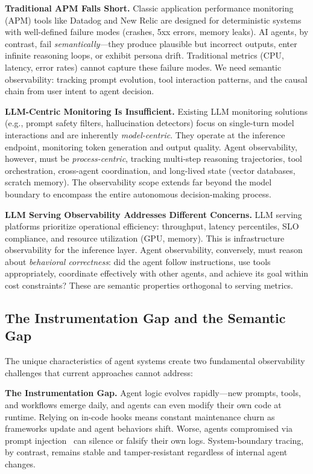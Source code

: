 \documentclass[sigplan,screen,review,9pt]{acmart}
\begin{document}
\textbf{Traditional APM Falls Short.} Classic application performance monitoring (APM) tools like Datadog and New Relic are designed for deterministic systems with well-defined failure modes (crashes, 5xx errors, memory leaks). AI agents, by contrast, fail \emph{semantically}—they produce plausible but incorrect outputs, enter infinite reasoning loops, or exhibit persona drift. Traditional metrics (CPU, latency, error rates) cannot capture these failure modes. We need semantic observability: tracking prompt evolution, tool interaction patterns, and the causal chain from user intent to agent decision.

\textbf{LLM-Centric Monitoring Is Insufficient.} Existing LLM monitoring solutions (e.g., prompt safety filters, hallucination detectors) focus on single-turn model interactions and are inherently \emph{model-centric}. They operate at the inference endpoint, monitoring token generation and output quality. Agent observability, however, must be \emph{process-centric}, tracking multi-step reasoning trajectories, tool orchestration, cross-agent coordination, and long-lived state (vector databases, scratch memory). The observability scope extends far beyond the model boundary to encompass the entire autonomous decision-making process.

\textbf{LLM Serving Observability Addresses Different Concerns.} LLM serving platforms prioritize operational efficiency: throughput, latency percentiles, SLO compliance, and resource utilization (GPU, memory). This is infrastructure observability for the inference layer. Agent observability, conversely, must reason about \emph{behavioral correctness}: did the agent follow instructions, use tools appropriately, coordinate effectively with other agents, and achieve its goal within cost constraints? These are semantic properties orthogonal to serving metrics.

\subsection{The Instrumentation Gap and the Semantic Gap}

The unique characteristics of agent systems create two fundamental observability challenges that current approaches cannot address:

\textbf{The Instrumentation Gap.} Agent logic evolves rapidly—new prompts, tools, and workflows emerge daily, and agents can even modify their own code at runtime. Relying on in-code hooks means constant maintenance churn as frameworks update and agent behaviors shift. Worse, agents compromised via prompt injection~\cite{indirect-prompt-inject} can silence or falsify their own logs. System-boundary tracing, by contrast, remains stable and tamper-resistant regardless of internal agent changes.
\end{document}
